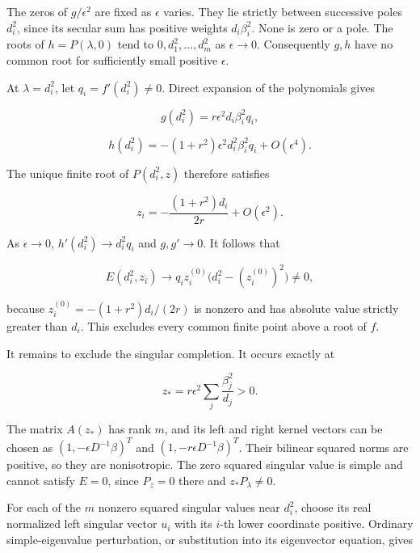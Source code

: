 \documentclass[10pt,a4paper]{article}
\begin{document}
The zeros of \(g/\epsilon^2\) are fixed as \(\epsilon\) varies. They lie
strictly between successive poles \(d_i^2\), since its secular sum has
positive weights \(d_i\beta_i^2\). None is zero or a pole. The roots of
\(h=P(\lambda,0)\) tend to \(0,d_1^2,\ldots,d_m^2\) as \(\epsilon\to0\).
Consequently \(g,h\) have no common root for sufficiently small positive
\(\epsilon\).

At \(\lambda=d_i^2\), let \(q_i=f'(d_i^2)\ne0\). Direct expansion of the
polynomials gives

\nopagebreak[4]

\[g(d_i^2)=r\epsilon^2d_i\beta_i^2q_i,\]

\nopagebreak[4]

\[h(d_i^2)=-(1+r^2)\epsilon^2d_i^2\beta_i^2q_i+O(\epsilon^4).\]

The unique finite root of \(P(d_i^2,z)\) therefore satisfies

\nopagebreak[4]

\[z_i=-\frac{(1+r^2)d_i}{2r}+O(\epsilon^2).\]

As \(\epsilon\to0\), \(h'(d_i^2)\to d_i^2q_i\) and \(g,g'\to0\). It
follows that

\nopagebreak[4]

\[E(d_i^2,z_i)\longrightarrow q_i z_i^{(0)}\bigl(d_i^2-(z_i^{(0)})^2\bigr)\ne0,\]

because \(z_i^{(0)}=-(1+r^2)d_i/(2r)\) is nonzero and has absolute value
strictly greater than \(d_i\). This excludes every common finite point
above a root of \(f\).

It remains to exclude the singular completion. It occurs exactly at

\nopagebreak[4]

\[z_*=r\epsilon^2\sum_j\frac{\beta_j^2}{d_j}>0.\]

The matrix \(A(z_*)\) has rank \(m\), and its left and right kernel
vectors can be chosen as \((1,-\epsilon D^{-1}\beta)^T\) and
\((1,-r\epsilon D^{-1}\beta)^T\). Their bilinear squared norms are
positive, so they are nonisotropic. The zero squared singular value is
simple and cannot satisfy \(E=0\), since \(P_z=0\) there and
\(z_*P_\lambda\ne0\).

For each of the \(m\) nonzero squared singular values near \(d_i^2\),
choose its real normalized left singular vector \(u_i\) with its
\(i\)-th lower coordinate positive. Ordinary simple-eigenvalue
perturbation, or substitution into its eigenvector equation, gives

\nopagebreak[4]
\end{document}
